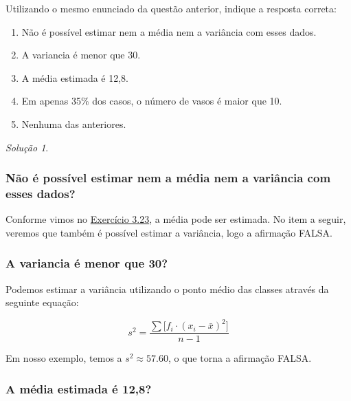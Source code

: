 \documentclass[
]{latex/krantz}
\providecommand{\tightlist}{%
  \setlength{\itemsep}{0pt}\setlength{\parskip}{0pt}}
\theoremstyle{definition}
\theoremstyle{definition}
\theoremstyle{definition}
\theoremstyle{definition}
\theoremstyle{remark}
\newtheorem*{solution}{Solução}
\begin{document}
Utilizando o mesmo enunciado da questão anterior, indique a resposta correta:

\begin{enumerate}
\def\labelenumi{\alph{enumi})}
\tightlist
\item
  Não é possível estimar nem a média nem a variância com esses dados.
\item
  A variancia é menor que 30.
\item
  A média estimada é 12,8.
\item
  Em apenas 35\% dos casos, o número de vasos é maior que 10.
\item
  Nenhuma das anteriores.
\end{enumerate}

\begin{solution}
\leavevmode

\hypertarget{nuxe3o-uxe9-possuxedvel-estimar-nem-a-muxe9dia-nem-a-variuxe2ncia-com-esses-dados}{%
\subsubsection*{Não é possível estimar nem a média nem a variância com esses dados?}\label{nuxe3o-uxe9-possuxedvel-estimar-nem-a-muxe9dia-nem-a-variuxe2ncia-com-esses-dados}}

Conforme vimos no \protect\hyperlink{exr3-23}{Exercício 3.23}, a média pode ser estimada. No item a seguir, veremos que também é possível estimar a variância, logo a afirmação FALSA.

\hypertarget{a-variancia-uxe9-menor-que-30}{%
\subsubsection*{A variancia é menor que 30?}\label{a-variancia-uxe9-menor-que-30}}

Podemos estimar a variância utilizando o ponto médio das classes através da seguinte equação:

\[
s^{2} = \frac{\sum \big[f_i \cdot (x_i - \bar{x})^2\big]}{n-1}
\]

Em nosso exemplo, temos a \(s^2 \approx 57.60\), o que torna a afirmação FALSA.

\hypertarget{a-muxe9dia-estimada-uxe9-128}{%
\subsubsection*{A média estimada é 12,8?}\label{a-muxe9dia-estimada-uxe9-128}}


\end{solution}
\end{document}
